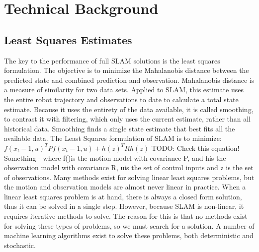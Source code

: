 \documentclass[12pt]{article}
\begin{document}
\section{Technical Background}
\subsection{ Least Squares Estimates }

The key to the performance of full SLAM solutions is the least squares formulation.  The objective is to minimize the Mahalanobis distance between the predicted state and combined prediction and observation.  Mahalanobis distance is a measure of similarity for two data sets.  Applied to SLAM, this estimate uses the entire robot trajectory and observations to date to calculate a total state estimate.  Because it uses the entirety of the data available, it is called smoothing, to contrast it with filtering, which only uses the current estimate, rather than all historical data.  Smoothing finds a single state estimate that best fits all the available data.  
	The Least Squares formulation of SLAM is to minimize:
$f(x_t-1,u)^TPf(x_t-1,u) + h(z)^TRh(z) $   TODO: Check this equation! Something -
	where f()is the motion model with covariance P, and his the observation model with covariance R, uis the set of control inputs and z is the set of observations.
 Many methods exist for solving linear least squares problems, but the motion and observation models are almost never linear in practice.  When a linear least squares problem is at hand, there is always a closed form solution, thus it can be solved in a single step.  However, because SLAM is non-linear, it requires iterative methods to solve.  The reason for this is that no methods exist for solving these types of problems, so we must search for a solution.  A number of machine learning algorithms exist to solve these problems, both deterministic and stochastic.
\end{document}
